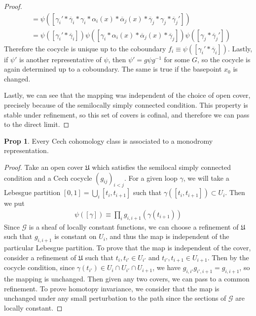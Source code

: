 \documentclass[11pt]{article}
\theoremstyle{definition}
\newtheorem{prop}{Prop}
\begin{document}
\begin{proof}
\begin{align}
&= \psi([\gamma_i' * \overline \gamma_i * \gamma_i * \alpha_i(x) * \overline \alpha_j(x) * \overline \gamma_j * \gamma_j * \overline \gamma_j']) \\
&= \psi([\gamma_i' * \overline \gamma_i])\psi([\gamma_i * \alpha_i(x) * \overline \alpha_j(x) * \overline \gamma_j])\psi([\gamma_j * \overline \gamma_j'])
\end{align}
Therefore the cocycle is unique up to the coboundary $f_i \equiv \psi([\gamma_i'
* \overline \gamma_i])$. Lastly, if $\psi'$ is another representative of $\psi$,
then $\psi'  = g\psi g^{-1}$ for some $G$, so the cocycle is again determined up
to a coboundary. The same is true if the basepoint $x_0$ is changed.

Lastly, we can see that the mapping was independent of the choice of open cover,
precisely because of the semilocally simply connected condition. This property
is stable under refinement, so this set of covers is cofinal, and therefore we
can pass to the direct limit.
\end{proof}

\begin{prop}
Every Cech cohomology class is associated to a monodromy representation.
\end{prop}

\begin{proof}
Take an open cover $\mathfrak U$ which satisfies the semilocal simply connected
condition and a Cech cocycle $(g_{ij})_{i < j}$. For a given loop $\gamma$, we
will take a Lebesgue partition $[0,1] = \bigcup_i[t_i, t_{i+1}]$ such that
$\gamma([t_i, t_{i+1}]) \subset U_i$. Then we put
\begin{align}
\psi([\gamma]) \equiv \prod_{i} g_{i,i+1}(\gamma(t_{i+1}))
\end{align}
Since $\mathcal G$ is a sheaf of locally constant functions, we can choose a
refinement of $\mathfrak U$ such that $g_{i, i+1}$ is constant on $U_i$, and
thus the map is independent of the particular Lebesgue partition. To prove that
the map is independent of the cover, consider a refinement of $\mathfrak U$
such that $t_i, t_{i'} \in U_{i'}$ and $t_{i'}, t_{i+1} \in U_{i+1}$. Then by
the cocycle condition, since $\gamma(t_{i'}) \in U_{i}\cap U_{i'} \cap U_{i+1}$, we have $g_{i, i'} g_{i',i+1} = g_{i, i+1}$, so the mapping is
unchanged. Then given any two covers, we can pass to a common refinement. To prove homotopy invariance, we consider that the map is unchanged
under any small perturbation to the path since the sections of $\mathcal G$ are locally constant.
\end{proof} 
\end{document}
